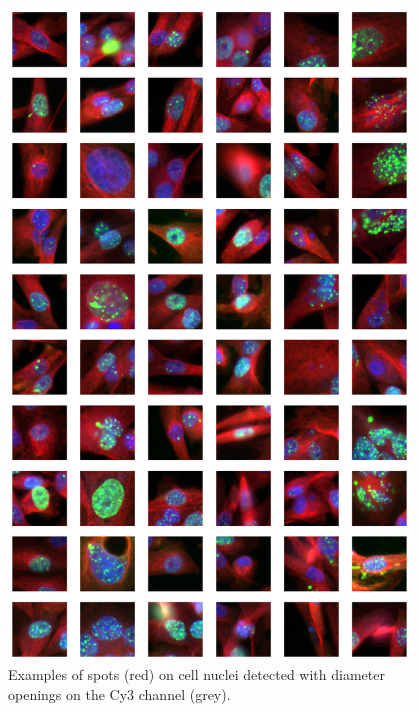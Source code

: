 \begin{figure}[h!]
\centering
\includegraphics[width=0.95\textwidth]{img/samples.pdf}
\caption{Examples of spots (red) on cell nuclei detected with diameter openings on the Cy3 channel (grey).}
\label{fig:cell_crop_samples}
\end{figure}



